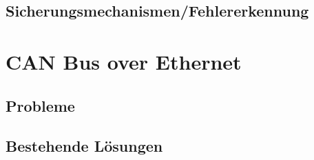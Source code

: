 	\subsection{Sicherungsmechanismen/Fehlererkennung}

\section{CAN Bus over Ethernet}
	
	\subsection{Probleme}
	
	\subsection{Bestehende Lösungen}



\newpage
{}
\listoffigures

\newpage
{}

%
